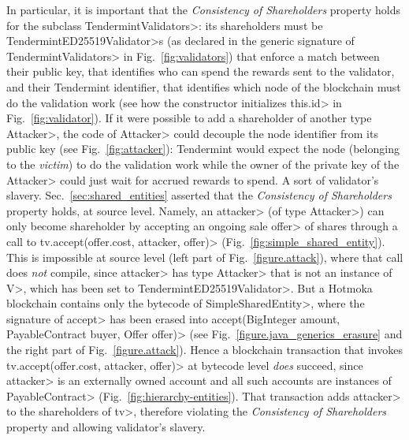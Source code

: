 In particular, it is important that the \emph{Consistency of Shareholders} property holds
for the subclass \<TendermintValidators>: its shareholders
must be \<TendermintED25519Validator>s (as declared in the generic
signature of \<TendermintValidators> in Fig.~\ref{fig:validators}) that enforce a
match between their public key, that identifies who can spend the rewards sent to the validator,
and their Tendermint identifier, that identifies which node of the blockchain
must do the validation work (see how the constructor initializes \<this.id> in
Fig.~\ref{fig:validator}).
If it were possible to add a shareholder of another
type \<Attacker>, the code of \<Attacker> could decouple the node identifier from its
public key (see Fig.~\ref{fig:attacker}):
Tendermint would expect the node (belonging to the \emph{victim}) to do
the validation work while the owner
of the private key of the \<Attacker> could just wait for accrued rewards to spend.
A sort of validator's slavery.
Sec.~\ref{sec:shared_entities} asserted that the \emph{Consistency of Shareholders}
property holds, at source level.
Namely, an \<attacker> (of type \<Attacker>) can only become shareholder
by accepting an ongoing sale \<offer> of shares through a call to
\<tv.accept(offer.cost, attacker, offer)> (Fig.~\ref{fig:simple_shared_entity}).
This is impossible at source level (left part of Fig.~\ref{figure.attack}),
where that call does \emph{not} compile, since \<attacker> has type \<Attacker> that
is not an instance of \<V>, which has been set to \<TendermintED25519Validator>.
But a Hotmoka blockchain contains only the bytecode of \<SimpleSharedEntity>,
where the signature of \<accept> has been erased into
\<accept(BigInteger amount, PayableContract buyer, Offer offer)>
(see Fig.~\ref{figure.java_generics_erasure} and the right part of
Fig.~\ref{figure.attack}).
Hence a blockchain transaction that invokes \<tv.accept(offer.cost, attacker, offer)>
at bytecode level
\emph{does} succeed, since \<attacker> is an externally owned account and all such accounts
are instances of \<PayableContract> (Fig.~\ref{fig:hierarchy-entities}).
That transaction adds \<attacker> to the shareholders of \<tv>,
therefore violating the \emph{Consistency of Shareholders} property and allowing
validator's slavery.
